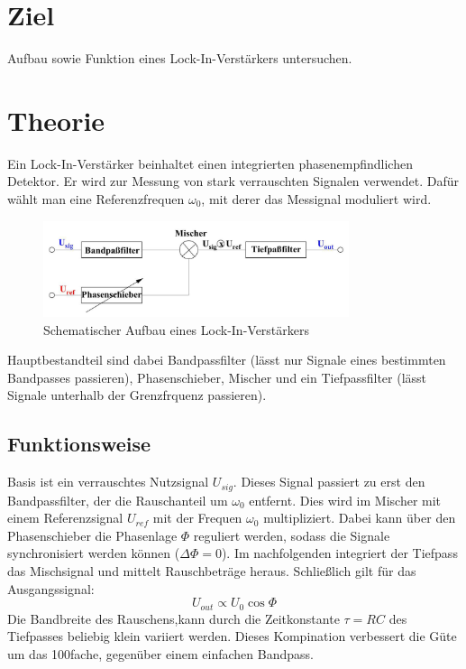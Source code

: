 \newpage
\section*{Ziel}
Aufbau sowie Funktion eines Lock-In-Verstärkers untersuchen.

\section{Theorie}
\label{sec:theorie}

Ein Lock-In-Verstärker beinhaltet einen integrierten phasenempfindlichen Detektor.
Er wird zur Messung von stark verrauschten Signalen verwendet.
Dafür wählt man eine Referenzfrequen $\omega_0$, mit derer das Messignal moduliert wird.
\begin{figure}[H]
    \centering
    \includegraphics[width=0.8\textwidth]{bilder/aufbau_schema.jpg}
    \caption{Schematischer Aufbau eines Lock-In-Verstärkers \cite[1]{Anleitung}}
    \label{fig:aufbau_generell}
\end{figure}

Hauptbestandteil sind dabei Bandpassfilter (lässt nur Signale eines bestimmten Bandpasses passieren),
Phasenschieber, Mischer und ein Tiefpassfilter (lässt Signale unterhalb der Grenzfrquenz passieren).
\subsection{Funktionsweise}

Basis ist ein verrauschtes Nutzsignal $U_{sig}$. Dieses Signal
passiert zu erst den Bandpassfilter, der die Rauschanteil um $\omega_0$ entfernt.
Dies wird im Mischer mit einem Referenzsignal $U_{ref}$ mit der Frequen $\omega_0$ multipliziert.
Dabei kann über den Phasenschieber die Phasenlage $\Phi$ reguliert werden, sodass
die Signale synchronisiert werden können ($\Delta \Phi=0$).
Im nachfolgenden integriert der Tiefpass das Mischsignal und mittelt Rauschbeträge
heraus. Schließlich gilt für das Ausgangssignal:
\begin{equation}
    U_{out} \propto U_0 \;\textrm{cos}\;\Phi
\end{equation}
Die Bandbreite des Rauschens,kann durch die Zeitkonstante $\tau=RC$
des Tiefpasses beliebig klein variiert werden.
Dieses Kompination verbessert die Güte um das 100fache, gegenüber einem
einfachen Bandpass.